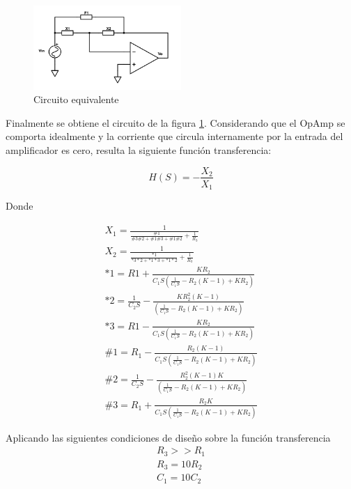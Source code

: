 \documentclass[../../tc_tp3_main.tex]{subfiles}
\begin{document}
\begin{figure}[H]
\centering
\includegraphics[width=0.5\textwidth]{imagenes/simplFin.png}
\caption{Circuito equivalente} \label{fig:csFin}
\end{figure}

Finalmente se obtiene el circuito de la figura \ref{fig:csFin}. Considerando que el OpAmp se comporta idealmente y la corriente que circula internamente por la entrada del amplificador es cero, resulta la siguiente  función transferencia:

\begin{equation}
H(S)=- \frac{X_2}{X_1}\label{eq:circuitoRed}
\end{equation}

Donde

\begin{gather}
X_1= \frac{1}{\frac{\# 1}{\#3 \# 2 + \#1 \#3 + \# 1 \# 2}+\frac{1}{R_3}}  \\
X_2= \frac{1}{\frac{* 1}{*3 * 2 + *1 *3 + * 1 * 2}+\frac{1}{R_3}} \\
*1=R1 +\frac{KR_2}{C_1 S \left(         \frac{1}{C_1 S} - R_2(K-1)+KR_2                 \right)}\\
*2=\frac{1}{C_2 S} -\frac{KR_2^2 (K-1)}{ \left(         \frac{1}{C_1 S} - R_2(K-1)+KR_2                 \right)}\\
*3=R1 -\frac{KR_2}{C_1 S \left(         \frac{1}{C_1 S} - R_2(K-1)+KR_2                 \right)}\\
\#1=R_1 - \frac{R_2(K-1)}{C_1S \left(  \frac{1}{C_1 S} - R_2 (K-1) + KR_2     \right)}\\
\#2=\frac{1}{C_2 S}- \frac{R_2^2(K-1)K}{ \left(  \frac{1}{C_1 S} - R_2 (K-1) + KR_2     \right)}\\
\#3=R_1 + \frac{R_2K}{C_1 S \left(  \frac{1}{C_1 S} - R_2 (K-1) + KR_2     \right)}
\end{gather}

Aplicando las siguientes condiciones de diseño sobre la función transferencia
\begin{gather}
 R_3 >> R_1   \\
 R_3 =10 R_2   \\
C_1=10C_2
\end{gather}
\end{document}
